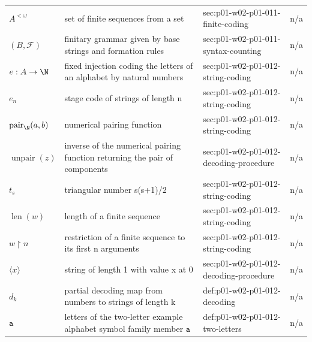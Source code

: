 \begin{longtable}{@{}p{}p{}p{}p{}@{}}
\(A^{<\omega}\) & set of finite sequences from a set & sec:\allowbreak{}p01-\allowbreak{}w02-\allowbreak{}p01-\allowbreak{}011-\allowbreak{}finite-\allowbreak{}coding & n/a \\
\((B,\allowbreak \mathcal F)\) & finitary grammar given by base strings and formation rules & sec:\allowbreak{}p01-\allowbreak{}w02-\allowbreak{}p01-\allowbreak{}011-\allowbreak{}syntax-\allowbreak{}counting & n/a \\
\(e:A\to\N\) & fixed injection coding the letters of an alphabet by natural numbers & sec:\allowbreak{}p01-\allowbreak{}w02-\allowbreak{}p01-\allowbreak{}012-\allowbreak{}string-\allowbreak{}coding & n/a \\
\(e_n\) & stage code of strings of length n & sec:\allowbreak{}p01-\allowbreak{}w02-\allowbreak{}p01-\allowbreak{}012-\allowbreak{}string-\allowbreak{}coding & n/a \\
\(\operatorname{pair}_{\N}(a,\allowbreak b)\) & numerical pairing function & sec:\allowbreak{}p01-\allowbreak{}w02-\allowbreak{}p01-\allowbreak{}012-\allowbreak{}string-\allowbreak{}coding & n/a \\
\(\operatorname{unpair}(z)\) & inverse of the numerical pairing function returning the pair of components & sec:\allowbreak{}p01-\allowbreak{}w02-\allowbreak{}p01-\allowbreak{}012-\allowbreak{}decoding-\allowbreak{}procedure & n/a \\
\(t_s\) & triangular number s(s+1)/2 & sec:\allowbreak{}p01-\allowbreak{}w02-\allowbreak{}p01-\allowbreak{}012-\allowbreak{}string-\allowbreak{}coding & n/a \\
\(\operatorname{len}(w)\) & length of a finite sequence & sec:\allowbreak{}p01-\allowbreak{}w02-\allowbreak{}p01-\allowbreak{}012-\allowbreak{}string-\allowbreak{}coding & n/a \\
\(w\mathbin{\upharpoonright}n\) & restriction of a finite sequence to its first n arguments & sec:\allowbreak{}p01-\allowbreak{}w02-\allowbreak{}p01-\allowbreak{}012-\allowbreak{}string-\allowbreak{}coding & n/a \\
\(\langle x\rangle\) & string of length 1 with value x at 0 & sec:\allowbreak{}p01-\allowbreak{}w02-\allowbreak{}p01-\allowbreak{}012-\allowbreak{}decoding-\allowbreak{}procedure & n/a \\
\(d_k\) & partial decoding map from numbers to strings of length k & def:\allowbreak{}p01-\allowbreak{}w02-\allowbreak{}p01-\allowbreak{}012-\allowbreak{}decoding & n/a \\
\(\mathtt a\) & letters of the two-letter example alphabet symbol family member \(\mathtt a\) & def:\allowbreak{}p01-\allowbreak{}w02-\allowbreak{}p01-\allowbreak{}012-\allowbreak{}two-\allowbreak{}letters & n/a \\

\end{longtable}
